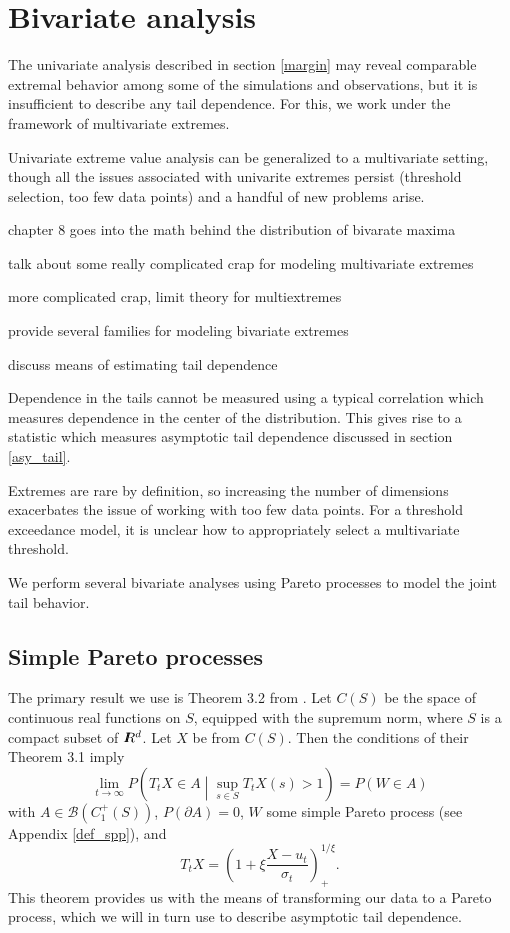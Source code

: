 \section{Bivariate analysis}
\label{bivariate}


The univariate analysis described in section \ref{margin} may reveal comparable extremal behavior among some of the simulations and observations, but it is insufficient to describe any tail dependence. For this, we work under the framework of multivariate extremes.

Univariate extreme value analysis can be generalized to a multivariate setting, though all the issues associated with univarite extremes persist (threshold selection, too few data points) and a handful of new problems arise.

\cite{coles2001introduction} chapter 8 goes into the math behind the distribution of bivarate maxima

\cite{goix2015sparsity} talk about some really complicated crap for modeling multivariate extremes

\cite{de1977limit} more complicated crap, limit theory for multiextremes

\cite{coles1991modelling} provide several families for modeling bivariate extremes

\cite{coles1999dependence} discuss means of estimating tail dependence

Dependence in the tails cannot be measured using a typical correlation which measures dependence in the center of the distribution. This gives rise to a statistic which measures asymptotic tail dependence discussed in section \ref{asy_tail}.

Extremes are rare by definition, so increasing the number of dimensions exacerbates the issue of working with too few data points. For a threshold exceedance model, it is unclear how to appropriately select a multivariate threshold. 

We perform several bivariate analyses using Pareto processes to model the joint tail behavior.

\subsection{Simple Pareto processes}
\label{simp_par}

The primary result we use is Theorem 3.2 from \cite{ferreira2014generalized}. Let $C(S)$ be the space of continuous real functions on $S$, equipped with the supremum norm, where $S$ is a compact subset of $I\hspace{-4.4pt}R^d$. Let $X$ be from $C(S)$. Then the conditions of their Theorem 3.1 imply
\[ \lim_{t\rightarrow\infty} P\left(T_t X \in A \middle| \sup_{s\in S} T_t X(s) > 1\right) = P(W \in A) \]
with $A \in \mathcal{B}(C_1^+(S))$, $P(\partial A)=0$, $W$ some simple Pareto process (see Appendix \ref{def_spp}), and
\[ T_t X = \left(1 + \xi \frac{X - u_t}{\sigma_t}\right)_+^{1/\xi}. \]
This theorem provides us with the means of transforming our data to a Pareto process, which we will in turn use to describe asymptotic tail dependence.

